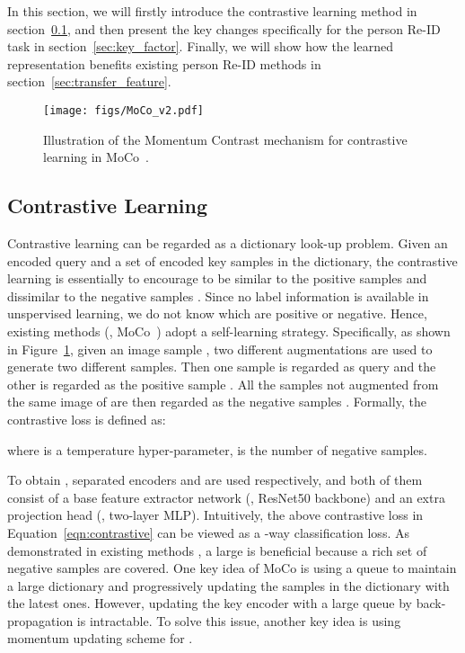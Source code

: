 \documentclass[final]{cvpr}
\newcommand{\Fref}[1]{Figure~\ref{#1}}
\begin{document}
In this section, we will firstly introduce the contrastive learning method in section~\ref{sec:contrastive_learning}, and then present the key changes specifically for the person Re-ID task in section~\ref{sec:key_factor}. Finally, we will show how the learned representation benefits existing person Re-ID methods in section~\ref{sec:transfer_feature}.

\begin{figure}[t]
    \begin{center}
        \texttt{[image: figs/MoCo\_v2.pdf]}
    \end{center}
  \vspace{-1.0em}
   \caption{Illustration of the Momentum Contrast mechanism for contrastive learning in MoCo~\cite{he2020momentum}.}
\label{fig:moco_v2}
\end{figure}

\subsection{Contrastive Learning}
\label{sec:contrastive_learning}
Contrastive learning can be regarded as a dictionary look-up problem. Given an encoded query  and a set of encoded key samples  in the dictionary, the contrastive learning is essentially to encourage  to be similar to the positive samples  and dissimilar to the negative samples . Since no label information is available in unspervised learning, we do not know which are positive or negative. Hence, existing methods (\eg, MoCo~\cite{he2020momentum}) adopt a self-learning strategy. Specifically, as shown in \Fref{fig:moco_v2}, given an image sample , two different augmentations  are used to generate two different samples. Then one sample is regarded as query  and the other is regarded as the positive sample . All the samples not augmented from the same image of  are then regarded as the negative samples . Formally, the contrastive loss is defined as:

where  is a temperature hyper-parameter,  is the number of negative samples. 

To obtain , separated encoders  and  are used respectively, and both of them consist of a base feature extractor network (\eg, ResNet50 backbone) and an extra projection head (\eg, two-layer MLP).  Intuitively, the above contrastive loss in Equation~\ref{eqn:contrastive} can be viewed as a -way classification loss. As demonstrated in existing methods \cite{chen2020simple,wu2018unsupervised}, a large  is beneficial because a rich set of negative samples are covered. One key idea of MoCo is using a queue to maintain a large dictionary and progressively updating the samples in the dictionary with the latest ones. However, updating the key encoder with a large queue by back-propagation is intractable. To solve this issue, another key idea is using momentum updating scheme for .
\end{document}
